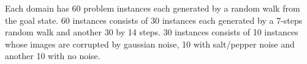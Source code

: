 Each domain has 60 problem instances each generated by a random walk from
the goal state. 60 instances consists of 30 instances each generated by a 7-steps random walk
and another 30 by 14 steps. 30 instances consists of 10 instances whose images are corrupted by gaussian noise,
10 with salt/pepper noise and another 10 with no noise.

% 
% 
% 
% 
